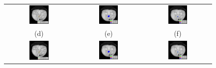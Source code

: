 \begin{figure}[h!]
\begin{center}
{\begin{tabular}{ccc}
				\includegraphics[width=0.3\textwidth]{Bulgular-Irdeleme/Figures/un2d1.pdf} & \includegraphics[width=0.3\textwidth]{Bulgular-Irdeleme/Figures/un2d2.pdf} & \includegraphics[width=0.3\textwidth]{Bulgular-Irdeleme/Figures/un2d3.pdf} \\
				(d) & (e)  & (f)\\
				\includegraphics[width=0.3\textwidth]{Bulgular-Irdeleme/Figures/fcn2d1.pdf} & \includegraphics[width=0.3\textwidth]{Bulgular-Irdeleme/Figures/fcn2d2.pdf} & \includegraphics[width=0.3\textwidth]{Bulgular-Irdeleme/Figures/fcn2d3.pdf} \\

\end{tabular}}
\end{center}
\end{figure}
